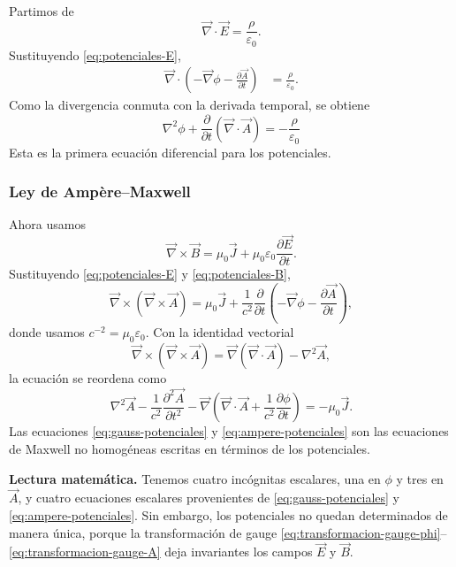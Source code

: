 \documentclass[12pt,a4paper]{article}
\theoremstyle{definition}
\theoremstyle{plain}
\numberwithin{equation}{section}
\theoremstyle{remark}
\newcommand{\E}{\vec{E}}
\newcommand{\B}{\vec{B}}
\newcommand{\J}{\vec{J}}
\begin{document}
Partimos de
\begin{equation*}
    \vec\nabla\cdot\E=\frac{\rho}{\varepsilon_0}.
\end{equation*}
Sustituyendo \eqref{eq:potenciales-E},
\begin{align}
    \vec\nabla\cdot\left(-\vec\nabla\phi-\frac{\partial\vec A}{\partial t}\right)
    &=\frac{\rho}{\varepsilon_0}.
\end{align}
Como la divergencia conmuta con la derivada temporal, se obtiene
\begin{equation}
    \boxed{
    \nabla^2\phi+\frac{\partial}{\partial t}\left(\vec\nabla\cdot\vec A\right)
    =-\frac{\rho}{\varepsilon_0}}
    \label{eq:gauss-potenciales}
\end{equation}
Esta es la primera ecuación diferencial para los potenciales.

\subsubsection*{Ley de Ampère--Maxwell}

Ahora usamos
\begin{equation*}
    \vec\nabla\times\B=\mu_0\J+\mu_0\varepsilon_0\frac{\partial\E}{\partial t}.
\end{equation*}
Sustituyendo \eqref{eq:potenciales-E} y \eqref{eq:potenciales-B},
\begin{equation}
    \vec\nabla\times(\vec\nabla\times\vec A)
    =\mu_0\J+\frac{1}{c^2}\frac{\partial}{\partial t}
    \left(-\vec\nabla\phi-\frac{\partial\vec A}{\partial t}\right),
    \label{eq:ampere-potenciales-inicio}
\end{equation}
donde usamos $c^{-2}=\mu_0\varepsilon_0$. Con la identidad vectorial
\begin{equation*}
    \vec\nabla\times(\vec\nabla\times\vec A)
    =\vec\nabla(\vec\nabla\cdot\vec A)-\nabla^2\vec A,
\end{equation*}
la ecuación se reordena como
\begin{equation}
    \boxed{
    \nabla^2\vec A-\frac{1}{c^2}\frac{\partial^2\vec A}{\partial t^2}
    -\vec\nabla\left(\vec\nabla\cdot\vec A+\frac{1}{c^2}\frac{\partial\phi}{\partial t}\right)
    =-\mu_0\J.}
    \label{eq:ampere-potenciales}
\end{equation}
Las ecuaciones \eqref{eq:gauss-potenciales} y \eqref{eq:ampere-potenciales} son las ecuaciones de Maxwell no homogéneas escritas en términos de los potenciales.

\begin{cajaidea}
\textbf{Lectura matemática.} Tenemos cuatro incógnitas escalares, una en $\phi$ y tres en $\vec A$, y cuatro ecuaciones escalares provenientes de \eqref{eq:gauss-potenciales} y \eqref{eq:ampere-potenciales}. Sin embargo, los potenciales no quedan determinados de manera única, porque la transformación de gauge \eqref{eq:transformacion-gauge-phi}--\eqref{eq:transformacion-gauge-A} deja invariantes los campos $\E$ y $\B$.
\end{cajaidea}
\end{document}
